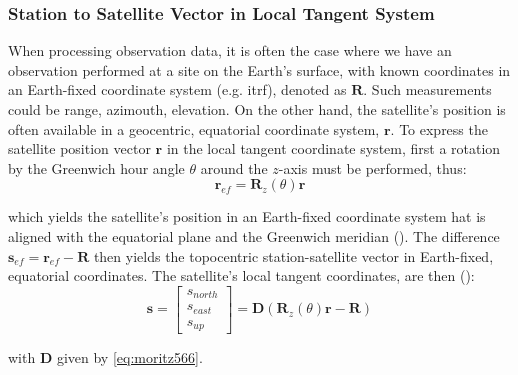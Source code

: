 \subsubsection{Station to Satellite Vector in Local Tangent System}
\label{sssec:station-to-satellite-vector-in-local-tangent-system}
When processing observation data, it is often the case where we have an 
observation performed at a site on the Earth's surface, with known coordinates 
in an Earth-fixed coordinate system (e.g. \gls{itrf}), denoted as $\bm{R}$. 
Such measurements could be range, azimouth, elevation. On the other hand, the 
satellite's position is often available in a geocentric, equatorial coordinate 
system, $\bm{r}$. To express the satellite position vector $\bm{r}$ in the 
local tangent coordinate system, first a rotation by the Greenwich hour angle 
$\theta$ around the $z$-axis must be performed, thus:
\begin{equation}
  \label{eq:mont289}
  \bm{r}_{ef} = \bm{R}_z (\theta ) \bm{r}
\end{equation}

which yields the satellite's position in an Earth-fixed coordinate system hat 
is aligned with the equatorial plane and the Greenwich meridian 
(\cite{Montenbruck2000}). The difference 
$\bm{s}_{ef} = \bm{r}_{ef} - \bm{R}$ then yields the topocentric 
station-satellite vector in Earth-fixed, equatorial coordinates. The satellite's 
local tangent coordinates, are then (\cite{Montenbruck2000}):
\begin{equation}
  \label{eq:mont294}
  \bm{s} = \begin{bmatrix} 
      s_{north} \\
      s_{east} \\
      s_{up}
    \end{bmatrix} 
  = \bm{D} \left( \bm{R}_z (\theta ) \bm{r} - \bm{R} \right)
\end{equation}

with $\bm{D}$ given by \ref{eq:moritz566}.

